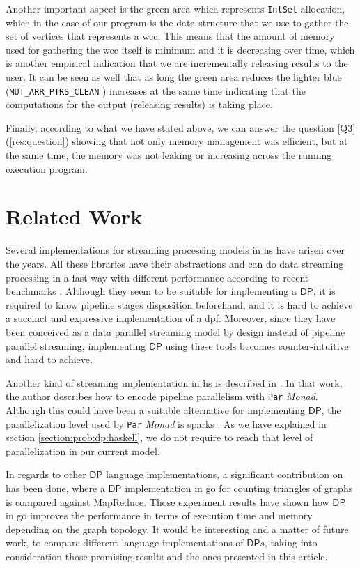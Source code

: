 \documentclass[preprint]{elsarticle}
\newcommand{\DP}{\mathsf{DP}}
\begin{document}
Another important aspect is the green area which represents \texttt{IntSet} allocation, which in the case of our program is the data structure that we use to gather the set of vertices that represents a \acrshort{wcc}. This means that the amount of memory used for gathering the \acrshort{wcc} itself is minimum and it is decreasing over time, which is another empirical indication that we are incrementally releasing results to the user. It can be seen as well that as long the green area reduces the lighter blue (\texttt{MUT_ARR_PTRS_CLEAN} \cite{ghcheap}) increases at the same time indicating that the computations for the output (releasing results) is taking place. 

Finally, according to what we have stated above, we can answer the question [Q3] (\autoref{res:question}) showing that not only memory management was efficient, but at the same time, the memory was not leaking or increasing across the running execution program.

\section{Related Work}
Several implementations for streaming processing models \cite{conduit, pipes, streamly} in \acrshort{hs} have arisen over the years. All these libraries have their abstractions and can do data streaming processing in a fast way with different performance according to recent benchmarks \cite{benchstreamhs}. Although they seem to be suitable for implementing a $\DP$, it is required to know pipeline stages disposition beforehand, and it is hard to achieve a succinct and expressive implementation of a \acrshort{dpf}. Moreover, since they have been conceived as a data parallel streaming model \cite{HR19} by design instead of pipeline parallel streaming, implementing $\DP$ using these tools becomes counter-intuitive and hard to achieve.

Another kind of streaming implementation in \acrshort{hs} is described in \cite{parallelbook}. In that work, the author describes how to encode pipeline parallelism with \texttt{Par} \textit{Monad}. Although this could have been a suitable alternative for implementing $\DP$, the parallelization level used by \texttt{Par} \textit{Monad} is sparks \cite{sparks}. As we have explained in section \autoref{section:prob:dp:haskell}, we do not require to reach that level of parallelization in our current model.

In regards to other $\DP$ language implementations, a significant contribution on \cite{dpp_triangles} has been done, where a $\DP$ implementation in \acrfull{go} for counting triangles of graphs is compared against MapReduce. Those experiment results have shown how $\DP$ in \acrshort{go} improves the performance in terms of execution time and memory depending on the graph topology. It would be interesting and a matter of future work, to compare different language implementations of $\DP s$, taking into consideration those promising results and the ones presented in this article.
\end{document}
